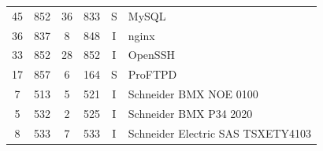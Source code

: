 \begin{table}[!htb]
\begin{tabular}{|c|c|c|c|c|l|}
			\hspace*{-0.15cm} 45	& \hspace*{-0.15cm} 852	& \hspace*{-0.15cm} 36	& \hspace*{-0.15cm} 833	& \hspace*{-0.15cm} S	& \hspace*{-0.15cm} MySQL	 \\
			\hspace*{-0.15cm} 36	& \hspace*{-0.15cm} 837	& \hspace*{-0.15cm} 8	& \hspace*{-0.15cm} 848	& \hspace*{-0.15cm} I	& \hspace*{-0.15cm} nginx	 \\
			\hspace*{-0.15cm} 33	& \hspace*{-0.15cm} 852	& \hspace*{-0.15cm} 28	& \hspace*{-0.15cm} 852	& \hspace*{-0.15cm} I	& \hspace*{-0.15cm} OpenSSH	 \\
			\hspace*{-0.15cm} 17	& \hspace*{-0.15cm} 857	& \hspace*{-0.15cm} 6	& \hspace*{-0.15cm} 164	& \hspace*{-0.15cm} S	& \hspace*{-0.15cm} ProFTPD	 \\
			\hspace*{-0.15cm} 7	& \hspace*{-0.15cm} 513	& \hspace*{-0.15cm} 5	& \hspace*{-0.15cm} 521	& \hspace*{-0.15cm} I	& \hspace*{-0.15cm} Schneider BMX NOE 0100	 \\
			\hspace*{-0.15cm} 5	& \hspace*{-0.15cm} 532	& \hspace*{-0.15cm} 2	& \hspace*{-0.15cm} 525	& \hspace*{-0.15cm} I	& \hspace*{-0.15cm} Schneider BMX P34 2020	 \\
			\hspace*{-0.15cm} 8	& \hspace*{-0.15cm} 533	& \hspace*{-0.15cm} 7	& \hspace*{-0.15cm} 533	& \hspace*{-0.15cm} I	& \hspace*{-0.15cm} Schneider Electric SAS TSXETY4103	 \\

\end{tabular}
\end{table}
